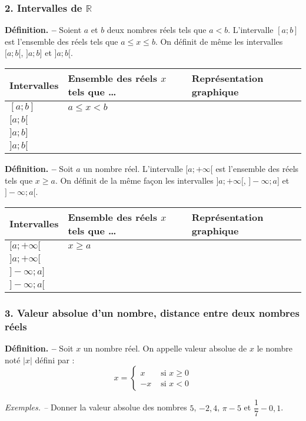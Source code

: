 \documentclass[handout]{beamer}
\begin{document}
\begin{frame}
  \frametitle{2. Intervalles de $\mathbb{R}$}
  \textbf{Définition. --} Soient $a$ et $b$ deux nombres réels tels que $a<b$. L'intervalle $[a;b]$ est l'ensemble des réels tels que $a\leq x\leq b$. On définit de même les intervalles $[a;b[$, $]a;b]$ et $]a;b[$.

  \bigskip

  \begin{center}
    \renewcommand{\arraystretch}{1.2}
    \begin{tabular}{|>{\centering}m{2cm}|>{\centering}m{4cm}|>{\centering}m{4cm}|}
      \hline
      \textbf{Intervalles} & \textbf{Ensemble des réels $x$ tels que \dots} & \textbf{Représentation graphique}\tabularnewline
      \hline
      $[a;b]$ & $a\leq x<b$ & \tabularnewline
      \hline
      $[a;b[$ & & \tabularnewline
      \hline
      $]a;b]$ & & \tabularnewline
      \hline
      $]a;b[$ & & \tabularnewline
      \hline
    \end{tabular}
  \end{center}
\end{frame}

\begin{frame}
  \textbf{Définition. --} Soit $a$ un nombre réel. L'intervalle $[a;+\infty[$ est l'ensemble des réels tels que $x\geq a$. On définit de la même façon les intervalles $]a;+\infty[$, $]-\infty;a]$ et $]-\infty;a[$.

  \begin{center}
    \renewcommand{\arraystretch}{1.2}
    \begin{tabular}{|>{\centering}m{2cm}|>{\centering}m{4cm}|>{\centering}m{4cm}|}
      \hline
      \textbf{Intervalles} & \textbf{Ensemble des réels $x$ tels que \dots} & \textbf{Représentation graphique}\tabularnewline
      \hline
      $[a;+\infty[$ & $x\geq a$ & \tabularnewline
      \hline
      $]a;+\infty[$ & & \tabularnewline
      \hline
      $]-\infty;a]$ & & \tabularnewline
      \hline
      $]-\infty;a[$ & & \tabularnewline
      \hline
    \end{tabular}
  \end{center}
\end{frame}

\begin{frame}
  \frametitle{3. Valeur absolue d'un nombre, distance entre deux nombres réels}
  \textbf{Définition. --} Soit $x$ un nombre réel. On appelle valeur absolue de $x$ le nombre noté $|x|$ défini par :
  \[x=\left\{
      \begin{aligned}
	x & \text{ si $x\geq 0$}\\
	-x& \text{ si $x<0$}
    \end{aligned}\right.\]

    \bigskip

    \textit{Exemples. --} Donner la valeur absolue des nombres $5$, $-2,4$, $\pi-5$ et $\dfrac{1}{7}-0,1$.
\end{frame}
\end{document}
